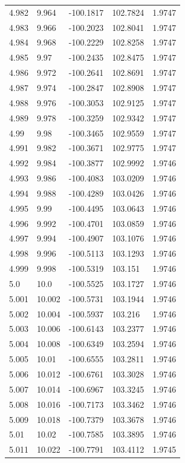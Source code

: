 \begin{tabular}{lllll}
4.982 & 9.964 & -100.1817 & 102.7824 & 1.9747 \\
4.983 & 9.966 & -100.2023 & 102.8041 & 1.9747 \\
4.984 & 9.968 & -100.2229 & 102.8258 & 1.9747 \\
4.985 & 9.97 & -100.2435 & 102.8475 & 1.9747 \\
4.986 & 9.972 & -100.2641 & 102.8691 & 1.9747 \\
4.987 & 9.974 & -100.2847 & 102.8908 & 1.9747 \\
4.988 & 9.976 & -100.3053 & 102.9125 & 1.9747 \\
4.989 & 9.978 & -100.3259 & 102.9342 & 1.9747 \\
4.99 & 9.98 & -100.3465 & 102.9559 & 1.9747 \\
4.991 & 9.982 & -100.3671 & 102.9775 & 1.9747 \\
4.992 & 9.984 & -100.3877 & 102.9992 & 1.9746 \\
4.993 & 9.986 & -100.4083 & 103.0209 & 1.9746 \\
4.994 & 9.988 & -100.4289 & 103.0426 & 1.9746 \\
4.995 & 9.99 & -100.4495 & 103.0643 & 1.9746 \\
4.996 & 9.992 & -100.4701 & 103.0859 & 1.9746 \\
4.997 & 9.994 & -100.4907 & 103.1076 & 1.9746 \\
4.998 & 9.996 & -100.5113 & 103.1293 & 1.9746 \\
4.999 & 9.998 & -100.5319 & 103.151 & 1.9746 \\
5.0 & 10.0 & -100.5525 & 103.1727 & 1.9746 \\
5.001 & 10.002 & -100.5731 & 103.1944 & 1.9746 \\
5.002 & 10.004 & -100.5937 & 103.216 & 1.9746 \\
5.003 & 10.006 & -100.6143 & 103.2377 & 1.9746 \\
5.004 & 10.008 & -100.6349 & 103.2594 & 1.9746 \\
5.005 & 10.01 & -100.6555 & 103.2811 & 1.9746 \\
5.006 & 10.012 & -100.6761 & 103.3028 & 1.9746 \\
5.007 & 10.014 & -100.6967 & 103.3245 & 1.9746 \\
5.008 & 10.016 & -100.7173 & 103.3462 & 1.9746 \\
5.009 & 10.018 & -100.7379 & 103.3678 & 1.9746 \\
5.01 & 10.02 & -100.7585 & 103.3895 & 1.9746 \\
5.011 & 10.022 & -100.7791 & 103.4112 & 1.9745 \\

\end{tabular}
